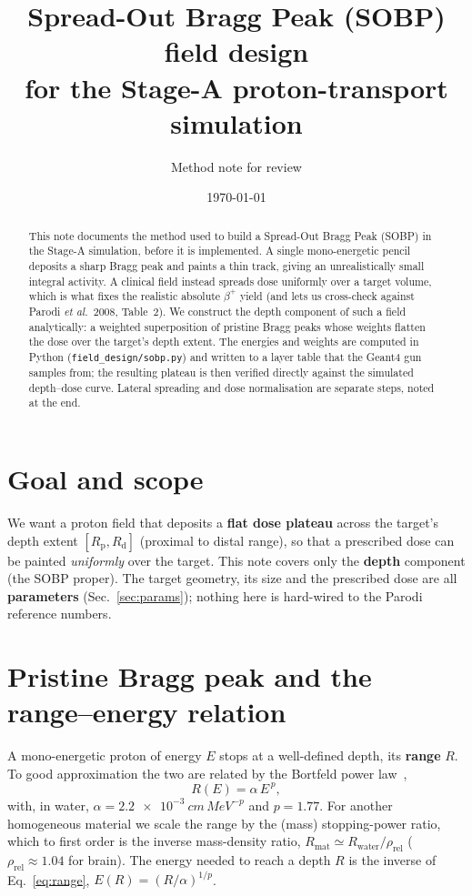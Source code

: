 \documentclass[11pt]{article}
\title{Spread-Out Bragg Peak (SOBP) field design\\
for the Stage-A proton-transport simulation}
\author{Method note for review}
\date{\today}
\newcommand{\Rd}{R_{\mathrm d}}
\newcommand{\Rp}{R_{\mathrm p}}
\begin{document}
\maketitle

\begin{abstract}
This note documents the method used to build a Spread-Out Bragg Peak (SOBP) in
the Stage-A simulation, before it is implemented. A single mono-energetic pencil
deposits a sharp Bragg peak and paints a thin track, giving an unrealistically
small integral activity. A clinical field instead spreads dose uniformly over a
target volume, which is what fixes the realistic absolute $\beta^{+}$ yield (and
lets us cross-check against Parodi \emph{et al.}\ 2008, Table~2). We construct
the depth component of such a field analytically: a weighted superposition of
pristine Bragg peaks whose weights flatten the dose over the target's depth
extent. The energies and weights are computed in Python
(\texttt{field\_design/sobp.py}) and written to a layer table that the Geant4
gun samples from; the resulting plateau is then verified directly against the
simulated depth--dose curve. Lateral spreading and dose normalisation are
separate steps, noted at the end.
\end{abstract}

\section{Goal and scope}

We want a proton field that deposits a \textbf{flat dose plateau} across the
target's depth extent $[\Rp,\Rd]$ (proximal to distal range), so that a
prescribed dose can be painted \emph{uniformly} over the target. This note
covers only the \textbf{depth} component (the SOBP proper). The target geometry,
its size and the prescribed dose are all \textbf{parameters}
(Sec.~\ref{sec:params}); nothing here is hard-wired to the Parodi reference
numbers.

\section{Pristine Bragg peak and the range--energy relation}
\label{sec:pristine}

A mono-energetic proton of energy $E$ stops at a well-defined depth, its
\textbf{range} $R$. To good approximation the two are related by the
Bortfeld power law~\cite{bortfeld1996},
\begin{equation}
R(E) = \alpha\,E^{\,p},
\label{eq:range}
\end{equation}
with, in water, $\alpha=\SI{2.2e-3}{cm\,MeV^{-p}}$ and $p=1.77$. For another
homogeneous material we scale the range by the (mass) stopping-power ratio,
which to first order is the inverse mass-density ratio,
$R_{\mathrm{mat}}\simeq R_{\mathrm{water}}/\rho_{\mathrm{rel}}$
($\rho_{\mathrm{rel}}\approx1.04$ for brain). The energy needed to reach a depth
$R$ is the inverse of Eq.~\eqref{eq:range}, $E(R)=(R/\alpha)^{1/p}$.
\end{document}
